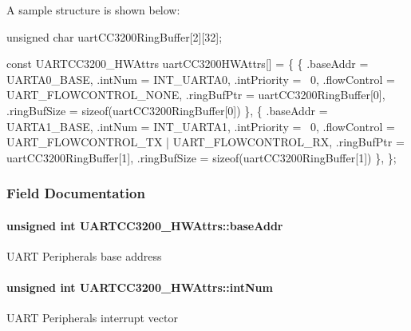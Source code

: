 A sample structure is shown below\+: 
\begin{DoxyCode}
\textcolor{keywordtype}{unsigned} \textcolor{keywordtype}{char} uartCC3200RingBuffer[2][32];

\textcolor{keyword}{const} UARTCC3200_HWAttrs uartCC3200HWAttrs[] = \{
    \{
        .baseAddr = UARTA0\_BASE,
        .intNum = INT\_UARTA0,
        .intPriority = ~0,
        .flowControl = UART\_FLOWCONTROL\_NONE,
        .ringBufPtr  = uartCC3200RingBuffer[0],
        .ringBufSize = \textcolor{keyword}{sizeof}(uartCC3200RingBuffer[0])
    \},
    \{
        .baseAddr = UARTA1\_BASE,
        .intNum = INT\_UARTA1,
        .intPriority = ~0,
        .flowControl = UART\_FLOWCONTROL\_TX | UART\_FLOWCONTROL\_RX,
        .ringBufPtr  = uartCC3200RingBuffer[1],
        .ringBufSize = \textcolor{keyword}{sizeof}(uartCC3200RingBuffer[1])
    \},
\};
\end{DoxyCode}
 

\subsubsection{Field Documentation}
\paragraph[{base\+Addr}]{\setlength{\rightskip}{0pt plus 5cm}unsigned int U\+A\+R\+T\+C\+C3200\+\_\+\+H\+W\+Attrs\+::base\+Addr}\label{struct_u_a_r_t_c_c3200___h_w_attrs_a559d6e21a7f9950e0d3e9d42413d47ea}
U\+A\+R\+T Peripheral\textquotesingle{}s base address 
\paragraph[{int\+Num}]{\setlength{\rightskip}{0pt plus 5cm}unsigned int U\+A\+R\+T\+C\+C3200\+\_\+\+H\+W\+Attrs\+::int\+Num}\label{struct_u_a_r_t_c_c3200___h_w_attrs_a45e245f429f6bba9b77223bdcd58f2a2}
U\+A\+R\+T Peripheral\textquotesingle{}s interrupt vector 
